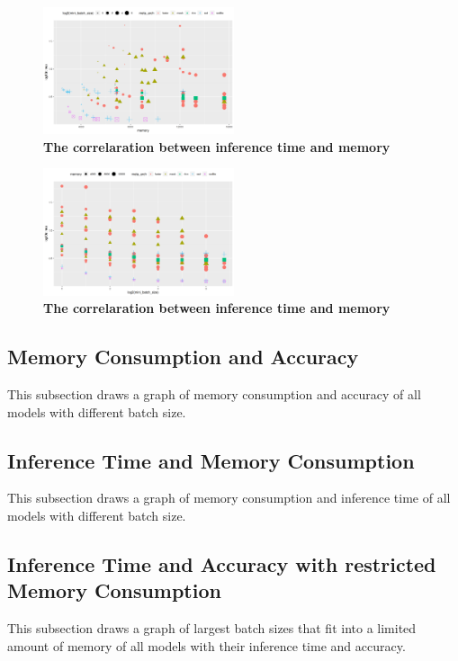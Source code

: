 \documentclass[conference]{IEEEtran}
\begin{document}
\begin{figure}[htpb]
	  \centering
	  \includegraphics[width=0.5\textwidth]{RunningTimeVSMemory-Batch}
	  \caption{\textbf{The correlaration between inference time and memory}}
	  \label{fig:running-memory-batch}
\end{figure}

\begin{figure}[htpb]
	  \centering
	  \includegraphics[width=0.5\textwidth]{RunningTimeVSBatch}
	  \caption{\textbf{The correlaration between inference time and memory}}
	  \label{fig:running-batch2}
\end{figure}

\subsection{Memory Consumption and Accuracy}
This subsection draws a graph of memory consumption and accuracy of all models with different batch size.

\subsection{Inference Time and Memory Consumption}
This subsection draws a graph of memory consumption and inference time of all models with different batch size.

\subsection{Inference Time and Accuracy with restricted Memory Consumption}
This subsection draws a graph of largest batch sizes that fit into a limited amount of memory of all models with their inference time and accuracy.
\end{document}
